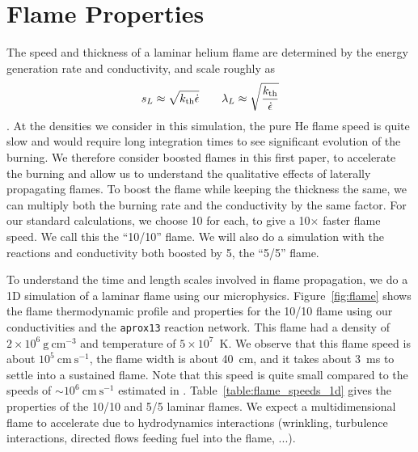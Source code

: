 \documentclass[preprint,times,tighten]{aastex63}
\newcommand{\epsdot}{\dot{\epsilon}}
\newcommand{\kth}{k_{\rm th}}
\newcommand{\gcc}{\mathrm{g~cm^{-3} }}
\newcommand{\cms}{\mathrm{cm~s^{-1} }}
\newcommand{\AssignTo}[1]{
    \marginpar{\vskip-\baselineskip%
               \raggedright%
               \tiny\sffamily%
               {\color{blue}\hrule%
               \smallskip%
               #1\par%
               \smallskip%
               \hrule}}%
}
\begin{document}
\section{Flame Properties}\label{Sec:Flame}

The speed and thickness of a laminar helium flame are determined by the
energy generation rate and conductivity, and scale roughly as
\begin{equation}
\label{eq:flame_scaling}
s_L \approx \sqrt{\kth \epsdot} \qquad
\lambda_L \approx \sqrt{\frac{\kth}{\epsdot}}
\end{equation}
\citep{orourke:1979,khokhlov:1993}.
At the densities we consider in this simulation, the pure He flame
speed is quite slow and would require long integration
times to see significant evolution of the burning.  We therefore
consider boosted flames in this first paper, to accelerate the burning
and allow us to understand the qualitative effects of laterally
propagating flames.  To boost the flame while keeping the thickness
the same, we can multiply both the burning rate and the conductivity
by the same factor.  For our standard calculations, we choose 10 for
each, to give a 10$\times$ faster flame speed.  We call this the ``10/10''
flame.  We will also do a simulation with the reactions and
conductivity both boosted by 5, the ``5/5'' flame.

To understand the time and length scales involved in flame
propagation, we do a 1D simulation of a laminar flame using our
microphysics.  Figure~\ref{fig:flame} shows the flame thermodynamic
profile and properties for the 10/10 flame using
our conductivities and the {\tt aprox13} reaction network.  This flame
had a density of $2\times 10^6~\gcc$ and
temperature of $5\times 10^7$~K.  We observe that this flame speed is
about $10^5~\cms$, the flame width is about 40~cm, and it
takes about 3~ms to settle into a sustained flame.  Note that this speed
is quite small compared to the speeds of $\sim 10^6~\cms$ estimated in
\citet{spitkovsky2002}.  Table~\ref{table:flame_speeds_1d} gives the properties
of the 10/10 and 5/5 laminar flames.  We expect a multidimensional flame to
accelerate due to hydrodynamics interactions (wrinkling, turbulence
interactions, directed flows feeding fuel into the flame, ...).


\begin{figure*}[t]
\caption{\label{fig:flame} Time-evolution of the 10$\times$ boosted 1D
	laminar flame. The left plot shows temperature and nuclear energy
	generation profiles at 11 different times, while the right plot
	shows flame propagation speed and flame thickness as functions of time.}
\end{figure*}
\end{document}
